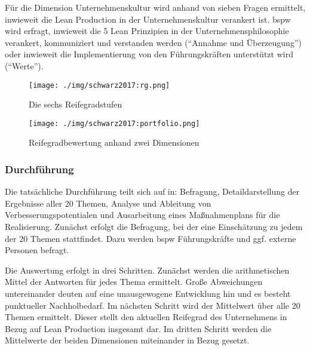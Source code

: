 Für die Dimension Unternehmenskultur wird anhand von sieben Fragen ermittelt, inwieweit die Lean Production in der Unternehmenskultur verankert ist. 
%
\Gls{bspw} wird erfragt, inwieweit die 5 Lean Prinzipien in der Unternehmensphilosophie verankert, kommuniziert und verstanden werden (``Annahme und Überzeugung'') oder inwieweit die Implementierung von den Führungskräften unterstützt wird (``Werte''). 

\begin{figure}[!ht] 
    \begin{minipage}{0.3\linewidth} 
    \begin{center}
      \texttt{[image: ./img/schwarz2017:rg.png]}
    \end{center}
      \caption[Die sechs Reifegradstufen]{Die sechs Reifegradstufen \autocite{Schwarz2017}}\label{fig:reifegrade} 
    \end{minipage} 
    \hfill 
    \begin{minipage}{0.6\linewidth} 
 \texttt{[image: ./img/schwarz2017:portfolio.png]}
    \caption[Reifegradbewertung anhand zwei Dimensionen]{Reifegradbewertung anhand zwei Dimensionen \autocite{Schwarz2017}}\label{fig:portfoliodarstellung} 
    \end{minipage} 
  \end{figure} 

\subsubsection{Durchführung}
Die tatsächliche Durchführung teilt sich auf in: Befragung, Detaildarstellung der Ergebnisse aller 20 Themen, Analyse und Ableitung von Verbesserungspotentialen und Ausarbeitung eines Maßnahmenplans für die Realisierung. 
%
Zunächst erfolgt die Befragung, bei der eine Einschätzung zu jedem der 20 Themen stattfindet. Dazu werden \gls{bspw} Führungskräfte und ggf. externe Personen befragt. 

Die Auswertung erfolgt in drei Schritten. Zunächst werden die arithmetischen Mittel der Antworten für jedes Thema ermittelt. Große Abweichungen untereinander deuten auf eine unausgewogene Entwicklung hin und es besteht punktueller Nachholbedarf. Im nächsten Schritt wird der Mittelwert über alle 20 Themen ermittelt. Dieser stellt den aktuellen Reifegrad des Unternehmens in Bezug auf Lean Production insgesamt dar. Im dritten Schritt werden die Mittelwerte der beiden Dimensionen miteinander in Bezug gesetzt. 

